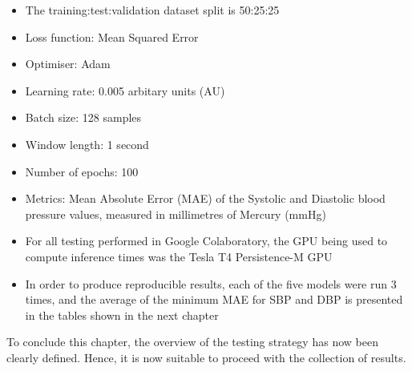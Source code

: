 \begin{itemize}
    \item The training:test:validation dataset split is 50:25:25
    \item Loss function: Mean Squared Error
    \item Optimiser: Adam
    \item Learning rate: 0.005 arbitary units (AU)
    \item Batch size: 128 samples
    \item Window length: 1 second
    \item Number of epochs: 100
    \item Metrics: Mean Absolute Error (MAE) of the Systolic and Diastolic blood pressure values, measured in millimetres of Mercury (mmHg)
    \item For all testing performed in Google Colaboratory, the GPU being used to compute
    inference times was the Tesla T4 Persistence-M GPU
    \item In order to produce reproducible results, each of the five models were run 3 times, and the average of the minimum MAE for SBP and DBP is presented in the tables shown in the next chapter
\end{itemize}\noindent To conclude this chapter, the overview of the testing strategy has now been clearly defined. Hence, it is now suitable to proceed with the collection of results.